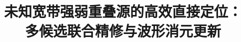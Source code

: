 \documentclass[a4paper,fleqn]{cas-sc}
\numberwithin{equation}{section}
\numberwithin{figure}{section}
\numberwithin{table}{section}
\begin{document}
\let\WriteBookmarks\relax
{}
\shortauthors{}
\title[mode=title]{未知宽带强弱重叠源的高效直接定位：\\多候选联合精修与波形消元更新}

\maketitle




\FloatBarrier

\FloatBarrier
\appendix

\FloatBarrier


\end{document}
